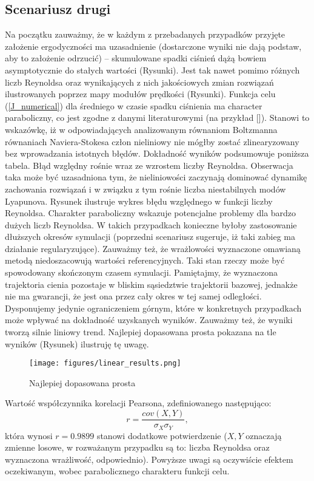 \documentclass[12pt]{article}
\begin{document}
\subsection{Scenariusz drugi}
Na początku zauważmy, że w każdym z przebadanych przypadków przyjęte założenie ergodyczności ma uzasadnienie (dostarczone wyniki nie dają podstaw, aby to założenie odrzucić) – skumulowane spadki ciśnień dążą bowiem asymptotycznie do stałych wartości (Rysunki).  Jest tak nawet pomimo różnych liczb Reynoldsa oraz wynikających z nich jakościowych zmian rozwiązań ilustrowanych poprzez mapy modułów prędkości (Rysunki). \newline
Funkcja celu (\ref{J_numerical}) dla średniego w czasie spadku ciśnienia ma character paraboliczny, co jest zgodne z danymi literaturowymi (na przykład []). Stanowi to wskazówkę, iż w odpowiadających analizowanym równaniom Boltzmanna równaniach Naviera-Stokesa człon nieliniowy nie mógłby zostać zlinearyzowany bez wprowadzania istotnych błędów. \newline
Dokładność wyników podsumowuje  poniższa tabela.
Błąd względny rośnie wraz ze wzrostem liczby Reynoldsa. Obserwacja taka może być uzasadniona tym, że nieliniowości zaczynają dominować dynamikę zachowania rozwiązań i w związku z tym rośnie liczba niestabilnych modów Lyapunova. Rysunek ilustruje wykres błędu względnego w funkcji liczby Reynoldsa.
Charakter paraboliczny wskazuje potencjalne problemy dla bardzo dużych liczb Reynoldsa. W takich przypadkach konieczne byłoby zastosowanie dłuższych okresów symulacji (poprzedni scenariusz sugeruje, iż taki zabieg ma działanie regularyzujące). \newline
Zauważmy też, że wrażlowości wyznaczone omawianą metodą niedoszacowują wartości referencyjnych. Taki stan rzeczy może być spowodowany skończonym czasem symulacji. Pamiętajmy, że wyznaczona trajektoria cienia pozostaje w bliskim sąsiedztwie trajektorii bazowej, jednakże nie ma gwarancji, że jest ona przez cały okres w tej samej odległości. Dysponujemy jedynie ograniczeniem górnym, które w konkretnych przypadkach może wpływać na dokładność uzyskanych wyników. \newline
Zauważmy też, że wyniki tworzą silnie liniowy trend. Najlepiej dopasowana prosta pokazana na tle wyników (Rysunek) ilustruję tę uwagę.
\begin{figure}[H]
	\texttt{[image: figures/linear\_results.png]} 
	\centering
	\caption{Najlepiej dopasowana prosta}
\end{figure}
Wartość współczynnika korelacji Pearsona, zdefiniowanego następująco:
\begin{equation}
r = \frac{cov(X,Y)}{\sigma_{X}\sigma_{Y}},
\end{equation}
która wynosi $ r = 0.9899 $ stanowi dodatkowe potwierdzenie ($ X, Y $ oznaczają zmienne losowe, w rozważanym przypadku są to: liczba Reynoldsa oraz wyznaczona wrażliwość, odpowiednio).\newline
Powyższe uwagi są oczywiście efektem oczekiwanym, wobec parabolicznego charakteru funkcji celu.\newline
\end{document}

